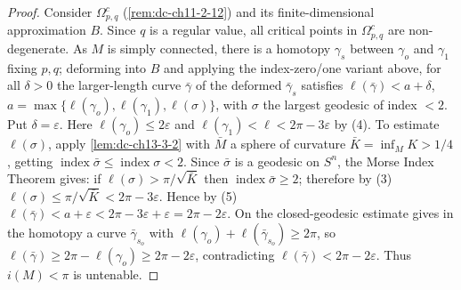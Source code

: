 \begin{proof}
  Consider $\Omega_{p,q}^c$ (\cref{rem:dc-ch11-2-12}) and its finite-dimensional
  approximation $B$. Since $q$ is a regular value, all critical points in
  $\Omega_{p,q}^c$ are non-degenerate. As $M$ is simply connected, there is a homotopy
  $\gamma_s$ between $\gamma_o$ and $\gamma_1$ fixing $p,q$; deforming into $B$ and
  applying the index-zero/one variant above, for all $\delta>0$ the larger-length curve
  $\bar\gamma$ of the deformed $\bar\gamma_s$ satisfies $\ell(\bar\gamma)<a+\delta$,
  $a=\max\{\ell(\gamma_o),\ell(\gamma_1),\ell(\sigma)\}$, with $\sigma$ the largest
  geodesic of index $<2$. Put $\delta=\varepsilon$. Here $\ell(\gamma_o)\leq2\varepsilon$
  and $\ell(\gamma_1)<\ell<2\pi-3\varepsilon$ by (4). To estimate $\ell(\sigma)$, apply
  \cref{lem:dc-ch13-3-2} with $\bar M$ a sphere of curvature $\bar K=\inf_M K>1/4$, getting
  $\operatorname{index}\bar\sigma\leq\operatorname{index}\sigma<2$. Since $\bar\sigma$
  is a geodesic on $S^n$, the Morse Index Theorem gives: if
  $\ell(\sigma)>\pi/\sqrt{\bar K}$ then $\operatorname{index}\bar\sigma\geq2$;
  therefore by (3) $\ell(\sigma)\leq\pi/\sqrt{\bar K}<2\pi-3\varepsilon$. Hence by (5)
  $\ell(\bar\gamma)<a+\varepsilon<2\pi-3\varepsilon+\varepsilon=2\pi-2\varepsilon$. On
  the closed-geodesic estimate gives in the
  homotopy a curve $\bar\gamma_{s_o}$ with $\ell(\gamma_o)+\ell(\bar\gamma_{s_o})\geq2\pi$,
  so $\ell(\bar\gamma)\geq2\pi-\ell(\gamma_o)\geq2\pi-2\varepsilon$, contradicting
  $\ell(\bar\gamma)<2\pi-2\varepsilon$. Thus $i(M)<\pi$ is untenable.
\end{proof}

